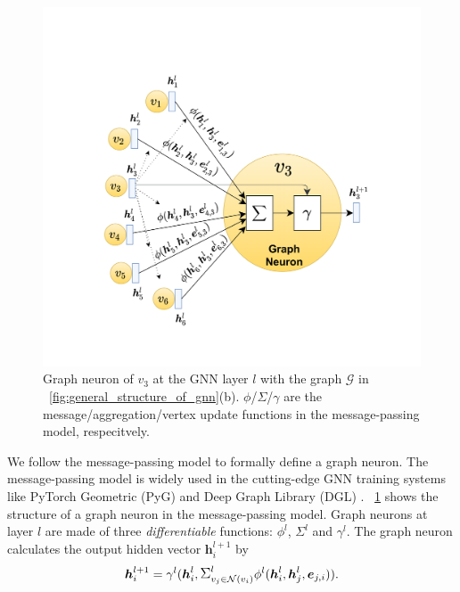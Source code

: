\begin{figure}
	\centering
	\includegraphics[width=0.6\columnwidth]{figs/illustration/GNN_Unit.png}
	\caption{Graph neuron of $v_3$ at the GNN layer $l$ with the graph $\mathcal{G}$ in \figurename~\ref{fig:general_structure_of_gnn}(b). $\phi$/$\Sigma$/$\gamma$ are the message/aggregation/vertex update functions in the message-passing model, respecitvely.}
	\label{fig:graph_neuron_structure}
\end{figure}

We follow the message-passing model \cite{gilmer_messgae_passing} to formally define a graph neuron.
The message-passing model is widely used in the cutting-edge GNN training systems like PyTorch Geometric (PyG) \cite{PyG} and Deep Graph Library (DGL) \cite{DGL}.
\figurename~\ref{fig:graph_neuron_structure} shows the structure of a graph neuron in the message-passing model.
Graph neurons at layer $l$ are made of three \emph{differentiable} functions: $\phi^l$, $\Sigma^l$ and $\gamma^l$.
The graph neuron calculates the output hidden vector $\boldsymbol{h}^{l+1}_i$ by
$$
\boldsymbol{h}^{l+1}_i = \gamma^l(\boldsymbol{h}^l_i, \mathlarger{\Sigma}^l_{v_j \in \mathcal{N}(v_i)}{\phi^l(\boldsymbol{h}^l_i, \boldsymbol{h}^l_j,	\boldsymbol{e}_{j,i})}).
$$

